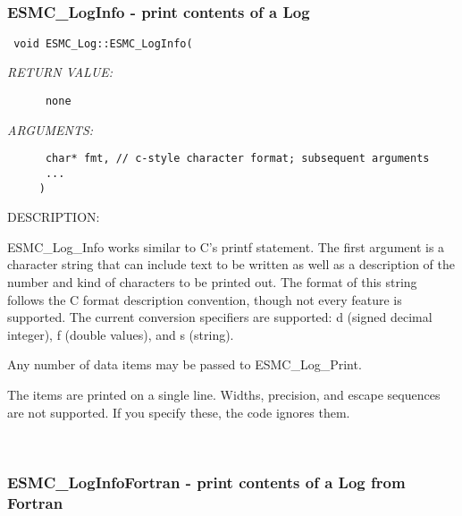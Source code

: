  
\mbox{}\hrulefill\ 
 
\subsubsection [ESMC\_LogInfo] {ESMC\_LogInfo - print contents of a Log}


  
\begin{verbatim} 
 void ESMC_Log::ESMC_LogInfo(
 \end{verbatim}{\em RETURN VALUE:}
\begin{verbatim}      none\end{verbatim}{\em ARGUMENTS:}
\begin{verbatim} 
      char* fmt, // c-style character format; subsequent arguments
      ...
     )\end{verbatim}
{\sf DESCRIPTION:\\ }


   ESMC\_Log\_Info works similar to C's printf statement.
   The first argument is a character string that can include text to be
   written as well as a description of the number and kind of characters
   to be printed out.
   The format of this string follows the C format description convention,
   though not every feature is supported.  The current conversion specifiers
   are supported: d (signed decimal integer), f (double values),
   and s (string).
  
   Any number of data items may be passed to ESMC\_Log\_Print.
   
   The items are printed on a single line.  Widths, precision, and
   escape sequences are not supported.  If you specify these, the code
   ignores them.
   
 
\mbox{}\hrulefill\ 
 
\subsubsection [ESMC\_LogInfoFortran] {ESMC\_LogInfoFortran - print contents of a Log from Fortran}


